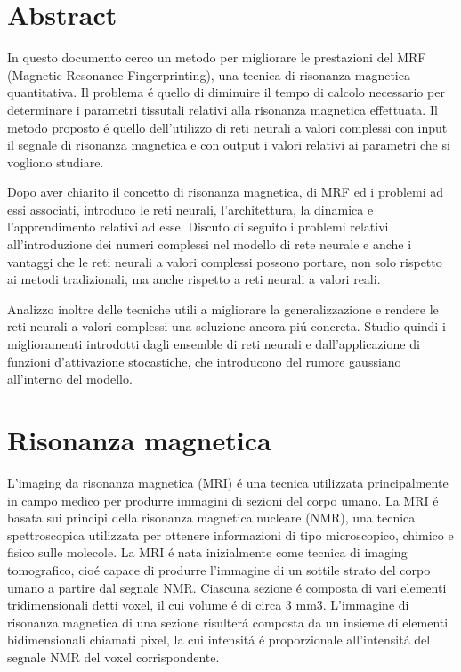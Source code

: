 \documentclass[a4paper,12pt]{report}
\begin{document}
 \chapter*{Abstract}
 
 In questo documento cerco un metodo per migliorare le prestazioni del MRF (Magnetic Resonance Fingerprinting), una tecnica di risonanza magnetica quantitativa. 
 Il problema \'e quello di diminuire il tempo di calcolo necessario per determinare i parametri tissutali relativi alla risonanza magnetica effettuata. 
 Il metodo proposto \'e quello dell'utilizzo di reti neurali a valori complessi con input il segnale di risonanza magnetica e con output i valori relativi ai parametri che si vogliono studiare. 
 
 Dopo aver chiarito il concetto di risonanza magnetica, di MRF ed i problemi ad essi associati, introduco le reti neurali, l'architettura, la dinamica e l'apprendimento relativi ad esse. 
 Discuto di seguito i problemi relativi all'introduzione dei numeri complessi nel modello di rete neurale e anche i vantaggi che le reti neurali a valori complessi possono portare, non solo rispetto ai metodi tradizionali, ma anche rispetto a reti neurali a valori reali.
 
 Analizzo inoltre delle tecniche utili a migliorare la generalizzazione e rendere le reti neurali a valori complessi una soluzione ancora pi\'u concreta. 
 Studio quindi i miglioramenti introdotti dagli ensemble di reti neurali e dall'applicazione di funzioni d'attivazione stocastiche, che introducono del rumore gaussiano all'interno del modello.
 
 \chapter*{Risonanza magnetica}
 
 L'imaging da risonanza magnetica (MRI) \'e una tecnica utilizzata principalmente in campo medico per produrre immagini di sezioni del corpo umano.
 La MRI \'e basata sui principi della risonanza magnetica nucleare (NMR), una tecnica spettroscopica utilizzata per ottenere informazioni di tipo microscopico, chimico e fisico sulle molecole.
 La MRI \'e nata inizialmente come tecnica di imaging tomografico, cio\'e capace di produrre l'immagine di un sottile strato del corpo umano a partire dal segnale NMR.
 Ciascuna sezione \'e composta di vari elementi tridimensionali detti voxel, il cui volume \'e di circa 3 mm3. 
 L'immagine di risonanza magnetica di una sezione risulter\'a composta da un insieme di elementi bidimensionali chiamati pixel, la cui intensit\'a \'e proporzionale all'intensit\'a del segnale NMR del voxel corrispondente.
 
\end{document}
